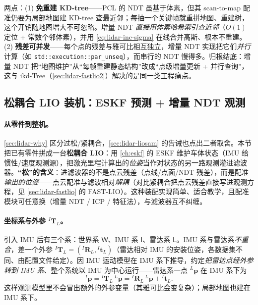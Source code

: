 \begin{insight}\label{ins:lidar-inc-ndt}
两点\cite{gao2023slamad}：(1) \textbf{免重建 KD-tree}——PCL 的 NDT 虽基于体素，但其 scan-to-map 配准仍要为局部地图建 KD-tree 查最近邻；每抽一个关键帧就重拼地图、重建树，这个开销随地图增大不可忽略。增量 NDT \emph{直接用体素哈希索引查近邻}（$O(1)$ 定位 + 常数个邻体素），并用 \cref{eq:lidar-inc-sigma} 在线合并高斯、根本不重建。(2) \textbf{残差可并发}——每个点的残差与雅可比相互独立，增量 NDT 实现把它们\emph{并行}计算（如 \texttt{std::execution::par\_unseq}），而串行的 NDT 慢得多。归根结底：增量 NDT 把“地图维护”从“每帧重建静态结构”改成“点级增量更新 + 并行查询”，这与 ikd-Tree（\cref{sec:lidar-fastlio2}）解决的是同一类工程痛点。
\end{insight}

\subsection{松耦合 LIO 装机：ESKF 预测 + 增量 NDT 观测}
\label{sec:lidar-loose-lio}

\paragraph{从零件到整机。}
\cref{sec:lidar-why} 区分过松/紧耦合，\cref{sec:lidar-liosam} 的告诫也点出二者取舍。本节把已有零件拼成一台\textbf{松耦合 LIO}\cite{gao2023slamad}：用 \cref{ch:eskf} 的 ESKF 维护车体状态（IMU 给惯性/速度观测源），把激光里程计算出的\emph{位姿}当作对状态的另一路观测灌进滤波器。\textbf{“松”的含义}：进滤波器的不是点云残差（点线/点面/NDT 残差），而是配准\emph{输出的位姿}——点云配准与滤波相对\emph{解耦}（对比紧耦合把点云残差直接写进观测方程，见 \cref{sec:lidar-fastlio} 的 FAST-LIO）。这种装配实现简单、适合教学，且配准模块可任意换（增量 NDT / ICP / 特征法），与滤波器互不纠缠。

\paragraph{坐标系与外参 ${}^I\mathbf{T}_L$。}
引入 IMU 后有三个系：世界系 $\mathsf{W}$、IMU 系 $\mathsf{I}$、雷达系 $\mathsf{L}$。IMU 系与雷达系\emph{不重合}，差一个外参 ${}^I\mathbf{T}_L=({}^I\mathbf{R}_L,{}^I\mathbf{t}_L)$（雷达相对 IMU 的安装位姿，各数据集不同、由配置文件给定）\cite{gao2023slamad}。因 IMU 运动模型在 IMU 系下推导，约定\emph{把雷达点经外参转到 IMU 系}、整个系统以 IMU 为中心运行——雷达系一点 ${}^L\mathbf{p}$ 在 IMU 系下为
\begin{equation}
  {}^I\mathbf{p}={}^I\mathbf{T}_L\,{}^L\mathbf{p}={}^I\mathbf{R}_L\,{}^L\mathbf{p}+{}^I\mathbf{t}_L.
  \label{eq:lidar-loose-extrin}
\end{equation}
这样观测模型里不会冒出额外的外参变量（其雅可比会变复杂）；局部地图也建在 IMU 系下。

